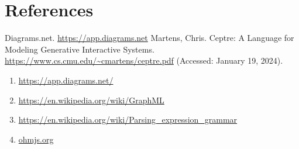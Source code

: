 \documentclass[10pt]{acmart}
\begin{document}
\section{References}

\begin{thebibliography}{9}
Diagrams.net.
\url{https://app.diagrams.net}
Martens, Chris. Ceptre: A Language for Modeling Generative Interactive Systems. \url{https://www.cs.cmu.edu/~cmartens/ceptre.pdf} (Accessed: January 19, 2024).
\end{thebibliography}

\begin{enumerate}
\item \href{https://app.diagrams.net/}{https://app.diagrams.net/}
\item \href{https://en.wikipedia.org/wiki/GraphML}{https://en.wikipedia.org/wiki/GraphML}
\item \href{https://en.wikipedia.org/wiki/Parsing_expression_grammar}{https://en.wikipedia.org/wiki/Parsing\_expression\_grammar}
\item \href{http://ohmjs.org}{ohmjs.org}
\end{enumerate}
\end{document}

